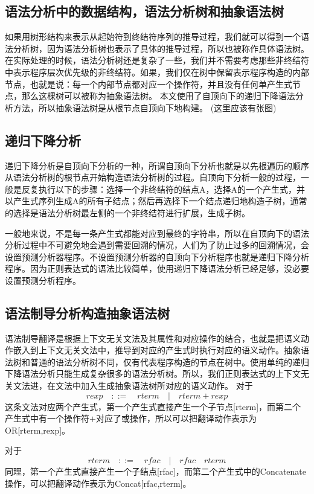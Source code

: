 \documentclass[openany,oneside]{book}
\theoremstyle{definition}
\theoremstyle{definition}
\begin{document}
	\subsection{语法分析中的数据结构，语法分析树和抽象语法树}
	如果用树形结构来表示从起始符到终结符序列的推导过程，我们就可以得到一个语法分析树，因为语法分析树也表示了具体的推导过程，所以也被称作具体语法树。在实际处理的时候，语法分析树还是复杂了一些，我们并不需要考虑那些非终结符中表示程序层次优先级的非终结符。如果，我们仅在树中保留表示程序构造的内部节点，也就是说：每一个内部节点都对应一个操作符，并且没有任何单产生式节点，那么这棵树可以被称为抽象语法树。\cite{2002编译原理}
	本文使用了自顶向下的递归下降语法分析方法，所以抽象语法树是从根节点自顶向下地构建。
	(这里应该有张图)
	\subsection{递归下降分析}
	递归下降分析是自顶向下分析的一种，所谓自顶向下分析也就是以先根遍历的顺序从语法分析树的根节点开始构造语法分析树的过程。自顶向下分析一般的过程，一般是反复执行以下的步骤：选择一个非终结符的结点A，选择A的一个产生式，并以产生式序列生成A的所有子结点；然后再选择下一个结点递归地构造子树，通常的选择是语法分析树最左侧的一个非终结符进行扩展，生成子树。
	
	一般地来说，不是每一条产生式都能对应到最终的字符串，所以在自顶向下的语法分析过程中不可避免地会遇到需要回溯的情况，人们为了防止过多的回溯情况，会设置预测分析器程序。不设置预测分析器的自顶向下分析程序也就是递归下降分析程序。因为正则表达式的语法比较简单，使用递归下降语法分析已经足够，没必要设置预测分析程序。
	
	\subsection{语法制导分析构造抽象语法树}
	语法制导翻译是根据上下文无关文法及其属性和对应操作的结合，也就是把语义动作嵌入到上下文无关文法中，推导到对应的产生式时执行对应的语义动作。抽象语法树和普通的语法分析树不同，仅有代表程序构造的节点在树中。使用单纯的递归下降语法分析只能生成复杂很多的语法分析树。所以，我们正则表达式的上下文无关文法进，在文法中加入生成抽象语法树所对应的语义动作。
	对于
	\begin{equation}
		rexp \quad::=\quad rterm\quad  | \quad rterm + rexp
	\end{equation}
	这条文法对应两个产生式，第一个产生式直接产生一个子节点[rterm]，而第二个产生式中有一个操作符\(+\)对应了或操作，所以可以把翻译动作表示为OR[rterm,rexp]。
	
	对于
	\begin{equation}
		rterm\quad::=\quad rfac\quad | \quad rfac\quad rterm
	\end{equation}
	同理，第一个产生式直接产生一个子结点[rfac]，而第二个产生式中的Concatenate操作，可以把翻译动作表示为Concat[rfac,rterm]。
	
\end{document}
